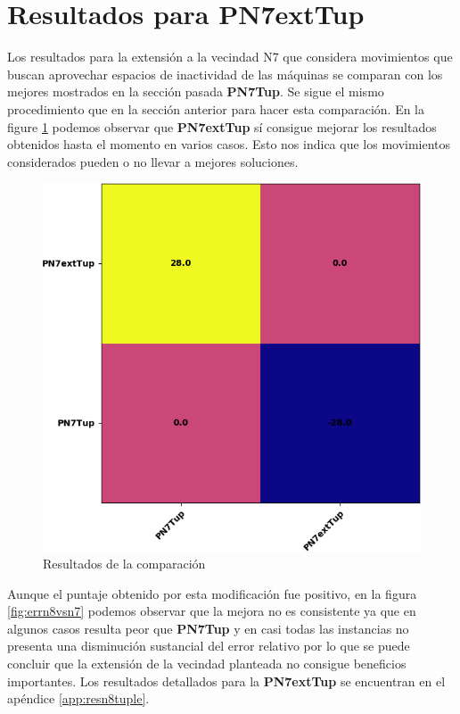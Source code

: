 \section{Resultados para PN7extTup}
Los resultados para la extensión a la vecindad N7 que considera movimientos que buscan aprovechar espacios de inactividad de las máquinas se comparan con los mejores mostrados en la sección pasada \textbf{PN7Tup}. Se sigue el mismo procedimiento que en la sección anterior para hacer esta comparación.
En la figure \ref{fig:n8vsn7} podemos observar que \textbf{PN7extTup} sí consigue mejorar los resultados obtenidos hasta el momento en varios casos. Esto nos indica que los movimientos considerados pueden o no llevar a mejores soluciones.

\begin{figure}[hbtp]
    \centering
    \includegraphics[scale=.7]{Imagenes/n8vsn7.png}
    \caption{Resultados de la comparación}
    \label{fig:n8vsn7}
\end{figure}

Aunque el puntaje obtenido por esta modificación fue positivo, en la figura \ref{fig:errn8vsn7} podemos observar que la mejora no es consistente ya que en algunos casos resulta peor que \textbf{PN7Tup} y en casi todas las instancias no presenta una disminución sustancial del error relativo por lo que se puede concluir que la extensión de la vecindad planteada no consigue beneficios importantes. Los resultados detallados para la \textbf{PN7extTup} se encuentran en el apéndice \ref{app:resn8tuple}.

